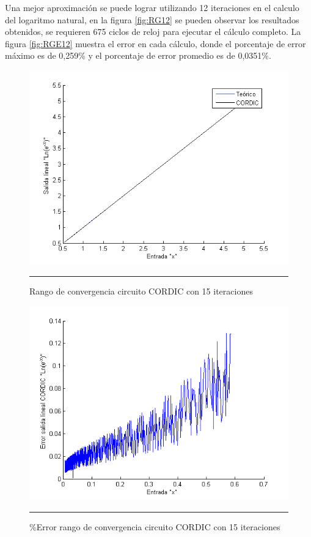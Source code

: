 Una mejor aproximación se puede lograr utilizando 12 iteraciones en el calculo del logaritmo natural, en la figura \ref{fig:RG12} se pueden observar los resultados obtenidos, se requieren 675 ciclos de reloj para ejecutar el cálculo completo. La figura \ref{fig:RGE12} muestra el error en cada cálculo, donde el porcentaje de error máximo es de  0,259\% y el porcentaje de error promedio es de 0,0351\%. 

\begin{figure}[H]
  \centering
    \includegraphics[scale=0.7]{./RANGO_15iter.png}
    \rule{35em}{0.5pt}
  \caption[Rango de convergencia circuito CORDIC con 15 iteraciones]{Rango de convergencia circuito CORDIC con 15 iteraciones   }
  \label{fig:RG15}
\end{figure}

\begin{figure}[H]
  \centering
    \includegraphics[scale=0.7]{./RANGO_15iter_ERROR.png}
    \rule{35em}{0.5pt}
  \caption[\%Error rango de convergencia circuito CORDIC con 15 iteraciones]{\%Error rango de convergencia circuito CORDIC con 15 iteraciones }
  \label{fig:RGE15}
\end{figure}


